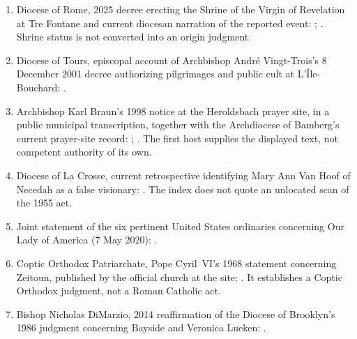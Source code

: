 \begin{enumerate}
  \item Diocese of Rome, 2025 decree erecting the Shrine of the Virgin of Revelation at Tre Fontane and current diocesan narration of the reported event: ; . Shrine status is not converted into an origin judgment.
  \item Diocese of Tours, episcopal account of Archbishop André Vingt-Trois's 8 December 2001 decree authorizing pilgrimages and public cult at L'Île-Bouchard: .
  \item Archbishop Karl Braun's 1998 notice at the Heroldsbach prayer site, in a public municipal transcription, together with the Archdiocese of Bamberg's current prayer-site record: ; . The first host supplies the displayed text, not competent authority of its own.
  \item Diocese of La Crosse, current retrospective identifying Mary Ann Van Hoof of Necedah as a false visionary: . The index does not quote an unlocated scan of the 1955 act.
  \item Joint statement of the six pertinent United States ordinaries concerning Our Lady of America (7 May 2020): .
  \item Coptic Orthodox Patriarchate, Pope Cyril~VI's 1968 statement concerning Zeitoun, published by the official church at the site: . It establishes a Coptic Orthodox judgment, not a Roman Catholic act.
  \item Bishop Nicholas DiMarzio, 2014 reaffirmation of the Diocese of Brooklyn's 1986 judgment concerning Bayside and Veronica Lueken: .

\end{enumerate}
